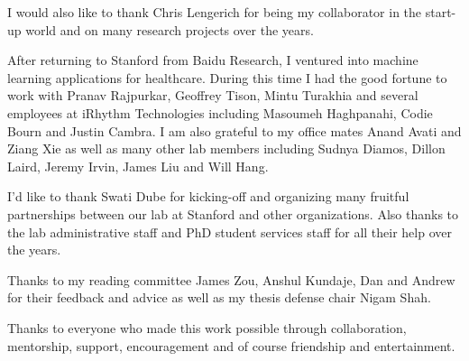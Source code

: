 I would also like to thank Chris Lengerich for being my collaborator in the
start-up world and on many research projects over the years.

After returning to Stanford from Baidu Research, I ventured into machine
learning applications for healthcare. During this time I had the good fortune
to work with Pranav Rajpurkar, Geoffrey Tison, Mintu Turakhia and several
employees at iRhythm Technologies including Masoumeh Haghpanahi, Codie Bourn
and Justin Cambra. I am also grateful to my office mates Anand Avati and Ziang
Xie as well as many other lab members including Sudnya Diamos, Dillon Laird,
Jeremy Irvin, James Liu and Will Hang.

I'd like to thank Swati Dube for kicking-off and organizing many fruitful
partnerships between our lab at Stanford and other organizations. Also thanks
to the lab administrative staff and PhD student services staff for all their
help over the years.

Thanks to my reading committee James Zou, Anshul Kundaje, Dan and Andrew for
their feedback and advice as well as my thesis defense chair Nigam Shah.

Thanks to everyone who made this work possible through collaboration,
mentorship, support, encouragement and of course friendship and entertainment.

\afterpreface

